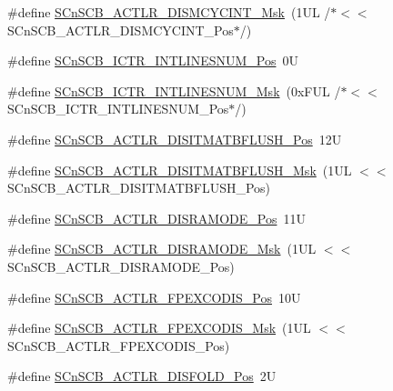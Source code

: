 \begin{DoxyCompactItemize}
\item 
\#define \hyperlink{group___c_m_s_i_s___s_cn_s_c_b_ga2a2818f0489ad10b6ea2964e899d4cbc}{S\+Cn\+S\+C\+B\+\_\+\+A\+C\+T\+L\+R\+\_\+\+D\+I\+S\+M\+C\+Y\+C\+I\+N\+T\+\_\+\+Msk}~(1\+U\+L /$\ast$$<$$<$ S\+Cn\+S\+C\+B\+\_\+\+A\+C\+T\+L\+R\+\_\+\+D\+I\+S\+M\+C\+Y\+C\+I\+N\+T\+\_\+\+Pos$\ast$/)
\item 
\#define \hyperlink{group___c_m_s_i_s___s_cn_s_c_b_ga0777ddf379af50f9ca41d40573bfffc5}{S\+Cn\+S\+C\+B\+\_\+\+I\+C\+T\+R\+\_\+\+I\+N\+T\+L\+I\+N\+E\+S\+N\+U\+M\+\_\+\+Pos}~0U
\item 
\#define \hyperlink{group___c_m_s_i_s___s_cn_s_c_b_ga3efa0f5210051464e1034b19fc7b33c7}{S\+Cn\+S\+C\+B\+\_\+\+I\+C\+T\+R\+\_\+\+I\+N\+T\+L\+I\+N\+E\+S\+N\+U\+M\+\_\+\+Msk}~(0x\+F\+U\+L /$\ast$$<$$<$ S\+Cn\+S\+C\+B\+\_\+\+I\+C\+T\+R\+\_\+\+I\+N\+T\+L\+I\+N\+E\+S\+N\+U\+M\+\_\+\+Pos$\ast$/)
\item 
\#define \hyperlink{group___c_m_s_i_s___s_cn_s_c_b_ga5f888e0ebc18cc2d99976405777c142f}{S\+Cn\+S\+C\+B\+\_\+\+A\+C\+T\+L\+R\+\_\+\+D\+I\+S\+I\+T\+M\+A\+T\+B\+F\+L\+U\+S\+H\+\_\+\+Pos}~12U
\item 
\#define \hyperlink{group___c_m_s_i_s___s_cn_s_c_b_ga46b16a03b408184720134ef42203ac2e}{S\+Cn\+S\+C\+B\+\_\+\+A\+C\+T\+L\+R\+\_\+\+D\+I\+S\+I\+T\+M\+A\+T\+B\+F\+L\+U\+S\+H\+\_\+\+Msk}~(1\+U\+L $<$$<$ S\+Cn\+S\+C\+B\+\_\+\+A\+C\+T\+L\+R\+\_\+\+D\+I\+S\+I\+T\+M\+A\+T\+B\+F\+L\+U\+S\+H\+\_\+\+Pos)
\item 
\#define \hyperlink{group___c_m_s_i_s___s_cn_s_c_b_ga1bffb5e05053d15cbe42fbe87d225dcb}{S\+Cn\+S\+C\+B\+\_\+\+A\+C\+T\+L\+R\+\_\+\+D\+I\+S\+R\+A\+M\+O\+D\+E\+\_\+\+Pos}~11U
\item 
\#define \hyperlink{group___c_m_s_i_s___s_cn_s_c_b_ga436fc1bd011b15c9585bb3ace5332ce3}{S\+Cn\+S\+C\+B\+\_\+\+A\+C\+T\+L\+R\+\_\+\+D\+I\+S\+R\+A\+M\+O\+D\+E\+\_\+\+Msk}~(1\+U\+L $<$$<$ S\+Cn\+S\+C\+B\+\_\+\+A\+C\+T\+L\+R\+\_\+\+D\+I\+S\+R\+A\+M\+O\+D\+E\+\_\+\+Pos)
\item 
\#define \hyperlink{group___c_m_s_i_s___s_cn_s_c_b_gaa743743f5af93d6ece74a426b355ab70}{S\+Cn\+S\+C\+B\+\_\+\+A\+C\+T\+L\+R\+\_\+\+F\+P\+E\+X\+C\+O\+D\+I\+S\+\_\+\+Pos}~10U
\item 
\#define \hyperlink{group___c_m_s_i_s___s_cn_s_c_b_gadd12baaeeea3220b03867e4b8a1432aa}{S\+Cn\+S\+C\+B\+\_\+\+A\+C\+T\+L\+R\+\_\+\+F\+P\+E\+X\+C\+O\+D\+I\+S\+\_\+\+Msk}~(1\+U\+L $<$$<$ S\+Cn\+S\+C\+B\+\_\+\+A\+C\+T\+L\+R\+\_\+\+F\+P\+E\+X\+C\+O\+D\+I\+S\+\_\+\+Pos)
\item 
\#define \hyperlink{group___c_m_s_i_s___s_cn_s_c_b_gaab395870643a0bee78906bb15ca5bd02}{S\+Cn\+S\+C\+B\+\_\+\+A\+C\+T\+L\+R\+\_\+\+D\+I\+S\+F\+O\+L\+D\+\_\+\+Pos}~2U
$$
\end{DoxyCompactItemize}

